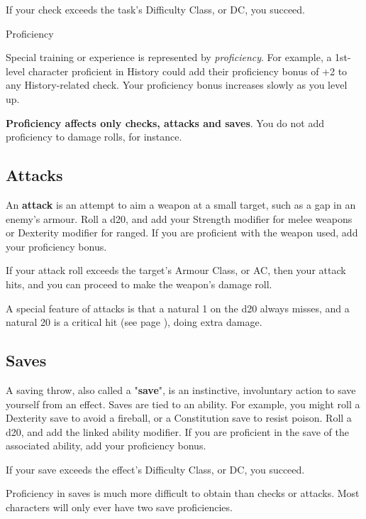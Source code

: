 \documentclass[letterpaper,twocolumn,openany,nodeprecatedcode,bg=print]{dndbook}
\newcommand{\pg}[1]{page \pageref{#1}}
\newcommand{\see}[1]{(see \pg{#1})}
\begin{document}
If your check exceeds the task's Difficulty Class, or DC, you succeed.

\begin{DndComment}{Proficiency}

\noindent Special training or experience is represented by \textit{proficiency}. 
For example, a 1st-level character proficient in History could add their proficiency bonus of +2 to any History-related check. 
Your proficiency bonus increases slowly as you level up.

\textbf{Proficiency affects only checks, attacks and saves}. 
You do not add proficiency to damage rolls, for instance.

\end{DndComment}

\subsection{Attacks}
An \textbf{attack} is an attempt to aim a weapon at a small target, such as a gap in an enemy's armour. 
Roll a d20, and add your Strength modifier for melee weapons or Dexterity modifier for ranged. 
If you are proficient with the weapon used, add your proficiency bonus.

If your attack roll exceeds the target's Armour Class, or AC, then your attack hits, and you can proceed to make the weapon's damage roll.

A special feature of attacks is that a natural 1 on the d20 always misses, and a natural 20 is a critical hit \see{critical-hit}, doing extra damage.

\subsection{Saves}
A saving throw, also called a "\textbf{save}", is an instinctive, involuntary action to save yourself from an effect. 
Saves are tied to an ability. 
For example, you might roll a Dexterity save to avoid a fireball, or a Constitution save to resist poison. 
Roll a d20, and add the linked ability modifier. 
If you are proficient in the save of the associated ability, add your proficiency bonus.

If your save exceeds the effect's Difficulty Class, or DC, you succeed.

Proficiency in saves is much more difficult to obtain than checks or attacks. 
Most characters will only ever have two save proficiencies.
\end{document}
